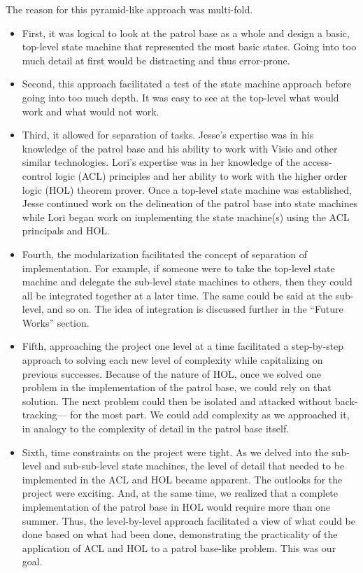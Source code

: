 The reason for this pyramid-like approach was multi-fold.
\begin{itemize}
\item First, it was logical to look at the patrol base as a whole and design a basic,
  top-level state machine that represented the most basic states. Going into too much
  detail at first would be distracting and thus error-prone.
\item Second, this approach facilitated a test of the state machine approach before
  going into too much depth. It was easy to see at the top-level what would work and
  what would not work.
\item Third, it allowed for separation of tasks. Jesse’s expertise was in his knowledge
  of the patrol base and his ability to work with Visio and other similar technologies.
  Lori’s expertise was in her knowledge of the access-control logic (ACL) principles and
  her ability to work with the higher order logic (HOL) theorem prover. Once a top-level
  state machine was established, Jesse continued work on the delineation of the patrol base
  into state machines while Lori began work on implementing the state machine(s) using the
  ACL principals and HOL.
\item Fourth, the modularization facilitated the concept of separation of implementation.
  For example, if someone were to take the top-level state machine and delegate the sub-level
  state machines to others, then they could all be integrated together at a later time. The
  same could be said at the sub-level, and so on. The idea of integration is discussed further
  in the “Future Works” section.
\item Fifth, approaching the project one level at a time facilitated a step-by-step approach
  to solving each new level of complexity while capitalizing on previous successes. Because of
  the nature of HOL, once we solved one problem in the implementation of the patrol base, we could
  rely on that solution. The next problem could then be isolated and attacked without back-tracking—
  for the most part. We could add complexity as we approached it, in analogy to the complexity of
  detail in the patrol base itself.
\item Sixth, time constraints on the project were tight. As we delved into the sub-level
  and sub-sub-level state machines, the level of detail that needed to be implemented in the
  ACL and HOL became apparent. The outlooks for the project were exciting. And, at the same time,
  we realized that a complete implementation of the patrol base in HOL would require more than one
  summer. Thus, the level-by-level approach facilitated a view of what could be done based on
  what had been done, demonstrating the practicality of the application of ACL and HOL to a patrol
  base-like problem. This was our goal.
\end{itemize}

